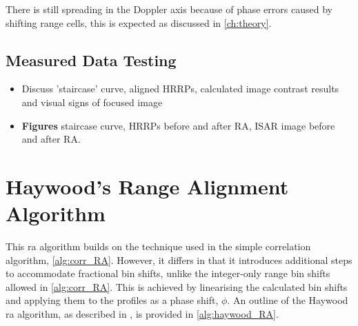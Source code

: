 \documentclass[class=report,11pt,crop=false]{standalone}
\begin{document}
There is still spreading in the Doppler axis because of phase errors caused by shifting range cells, this is expected as discussed in \autoref{ch:theory}.
    \subsection{Measured Data Testing}
    \begin{itemize}
        \item Discuss 'staircase' curve, aligned HRRPs, calculated image contrast results and visual signs of focused image
        \item \textbf{Figures} staircase curve, HRRPs before and after RA, ISAR image before and after RA.
    \end{itemize}

\section{Haywood's Range Alignment Algorithm}
This \gls{ra} algorithm builds on the technique used in the simple correlation algorithm, \autoref{alg:corr_RA}. However, it differs in that it introduces additional steps to accommodate fractional bin shifts, unlike the integer-only range bin shifts allowed in \autoref{alg:corr_RA}. This is achieved by linearising the calculated bin shifts and applying them to the profiles as a phase shift, $\phi$. An outline of the Haywood \gls{ra} algorithm, as described in \cite{haywood_RA_AF,zyweck}, is provided in \autoref{alg:haywood_RA}.
\end{document}
